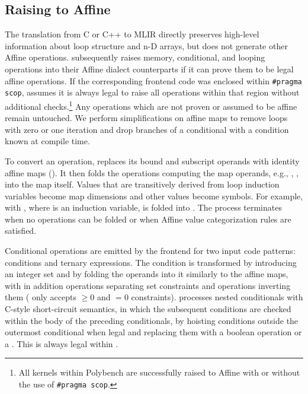 \subsection{Raising to Affine}\label{sec:raising}

The translation from C or C++ to MLIR directly preserves high-level information about loop structure and n-D arrays, but does not generate other Affine operations. \tool subsequently raises memory, conditional, and looping operations into their Affine dialect counterparts if it can prove them to be legal affine operations. If the corresponding frontend code was enclosed within \texttt{\#pragma scop}, \tool assumes it is always legal to raise all operations within that region without additional checks.\footnote{All kernels within Polybench are successfully raised to Affine with or without the use of \texttt{\#pragma scop}.} Any operations which are not proven or assumed to be affine remain untouched. We perform simplifications on affine maps to remove loops with zero or one iteration and drop branches of a conditional with a condition known at compile time.

To convert an operation, \tool replaces its bound and subscript operands with identity affine maps (). It then folds the operations computing the map operands, e.g., , , into the map itself. Values that are transitively derived from loop induction variables become map dimensions and other values become symbols. For example,  with , where  is an induction variable, is folded into . The process terminates when no operations can be folded or when Affine value categorization rules are satisfied.

Conditional operations are emitted by the frontend for two input code patterns:  conditions and ternary expressions. The condition is transformed by introducing an integer set and by folding the operands into it similarly to the affine maps, with in addition  operations separating set constraints and  operations inverting them ( only accepts $\geq 0$ and $=0$ constraints). \tool processes nested conditionals with C-style short-circuit semantics, in which the subsequent conditions are checked within the body of the preceding conditionals, by hoisting conditions outside the outermost conditional when legal and replacing them with a boolean operation or a . This is always legal within .

